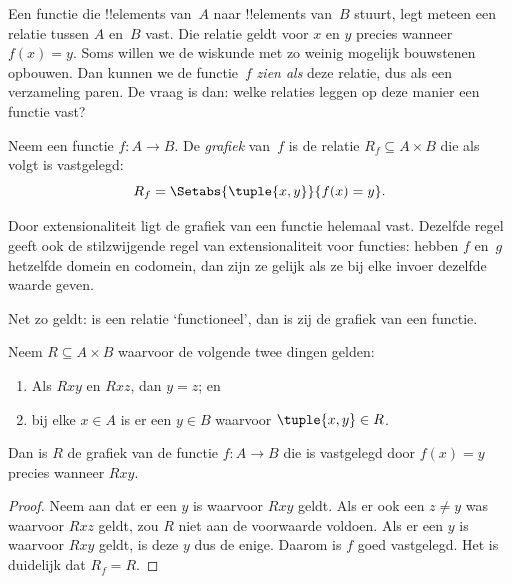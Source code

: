 \documentclass[../../../include/open-logic-section]{subfiles}
\begin{document}


\begin{explain}
Een functie die !!{element}s van~$A$ naar !!{element}s van~$B$ stuurt,
legt meteen een relatie tussen $A$ en~$B$ vast. Die relatie geldt voor
$x$ en $y$ precies wanneer $f(x) = y$. Soms willen we de wiskunde met
zo weinig mogelijk bouwstenen opbouwen. Dan kunnen we de functie~$f$
\emph{zien als} deze relatie, dus als een verzameling paren. De vraag
is dan: welke relaties leggen op deze manier een functie vast?
\end{explain}

\begin{defn} Neem een functie $f\colon A \to
B$. De \emph{grafiek} van~$f$ is de relatie $R_f \subseteq A \times
B$ die als volgt is vastgelegd:
\[
R_f = \Setabs{\tuple{x,y}}{f(x) = y}.
\]
\end{defn}

\begin{explain}
Door extensionaliteit ligt de grafiek van een functie helemaal vast.
Dezelfde regel geeft ook de stilzwijgende regel van extensionaliteit
voor functies: hebben $f$ en~$g$ hetzelfde domein en codomein, dan
zijn ze gelijk als ze bij elke invoer dezelfde waarde geven.

Net zo geldt: is een relatie ‘functioneel’, dan is zij de grafiek van
een functie.
\end{explain}

\begin{prop}
Neem $R \subseteq A \times B$ waarvoor de volgende twee dingen gelden:
\begin{enumerate}
\item Als $Rxy$ en $Rxz$, dan $y = z$; en
\item bij elke $x \in A$ is er een $y \in B$ waarvoor $\tuple{x,
y} \in R$.
\end{enumerate}
Dan is $R$ de grafiek van de functie $f\colon A \to B$ die is
vastgelegd door $f(x) = y$ precies wanneer $Rxy$.
\end{prop}

\begin{proof}
Neem aan dat er een $y$ is waarvoor $Rxy$ geldt. Als er ook een $z
\neq y$ was waarvoor $Rxz$ geldt, zou $R$ niet aan de voorwaarde
voldoen. Als er een $y$ is waarvoor $Rxy$ geldt, is deze $y$ dus de
enige. Daarom is $f$ goed vastgelegd. Het is duidelijk dat $R_f = R$.
\end{proof}
\end{document}

